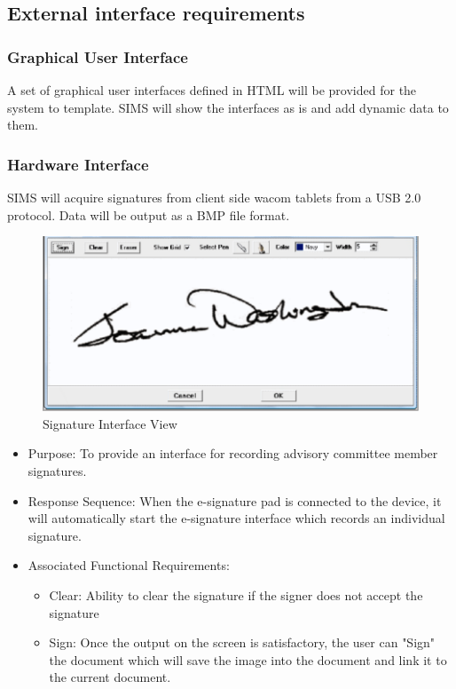 \documentclass[11pt,a4paper]{report}
\begin{document}
\subsection{External interface requirements}
\subsubsection{Graphical User Interface}
A set of graphical user interfaces defined in HTML will be provided for the system to template. SIMS will show the interfaces as is and add dynamic data to them. 
\subsubsection{Hardware Interface}
SIMS will acquire signatures from client side wacom tablets from a USB 2.0 protocol. Data will be output as a BMP file format. 

\begin{figure}[htp]
\centering
\includegraphics[scale=0.75]{diagrams/HTMLTemplating/Figure6.png}
\caption{Signature Interface View}
\label{fig:signature}
\end{figure}

\begin{itemize}
\item Purpose: To provide an interface for recording advisory committee member signatures.
\item Response Sequence: When the e-signature pad is connected to the device, it will automatically start the e-signature interface which records an individual signature.
\item Associated Functional Requirements:
\begin{itemize}
\item Clear: Ability to clear the signature if the signer does not accept the signature
\item Sign: Once the output on the screen is satisfactory, the user can "Sign" the document which will save the image into the document and link it to the current document.
\end{itemize}
\end{itemize}
\end{document}
